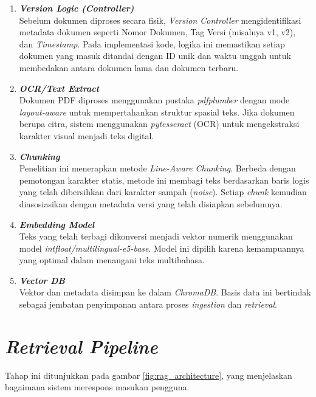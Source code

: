 \begin{enumerate}
    \item \textbf{\textit{Version Logic (Controller)}} \\
    Sebelum dokumen diproses secara fisik, \textit{Version Controller} mengidentifikasi metadata dokumen seperti Nomor Dokumen, Tag Versi (misalnya v1, v2), dan \textit{Timestamp}. Pada implementasi kode, logika ini memastikan setiap dokumen yang masuk ditandai dengan ID unik dan waktu unggah untuk membedakan antara dokumen lama dan dokumen terbaru.
    
    \item \textbf{\textit{OCR/Text Extract}} \\
    Dokumen PDF diproses menggunakan pustaka \textit{pdfplumber} dengan mode \textit{layout-aware} untuk mempertahankan struktur spasial teks. Jika dokumen berupa citra, sistem menggunakan \textit{pytesseract} (OCR) untuk mengekstraksi karakter visual menjadi teks digital.
    
    \item \textbf{\textit{Chunking}} \\
    Penelitian ini menerapkan metode \textit{Line-Aware Chunking}. Berbeda dengan pemotongan karakter statis, metode ini membagi teks berdasarkan baris logis yang telah dibersihkan dari karakter sampah (\textit{noise}). Setiap \textit{chunk} kemudian diasosiasikan dengan metadata versi yang telah disiapkan sebelumnya.
    
    \item \textbf{\textit{Embedding Model}} \\
    Teks yang telah terbagi dikonversi menjadi vektor numerik menggunakan model \textit{intfloat/multilingual-e5-base}. Model ini dipilih karena kemampuannya yang optimal dalam menangani teks multibahasa.
    
    \item \textbf{\textit{Vector DB}} \\
    Vektor dan metadata disimpan ke dalam \textit{ChromaDB}. Basis data ini bertindak sebagai jembatan penyimpanan antara proses \textit{ingestion} dan \textit{retrieval}.
\end{enumerate}

\newpage
\section{\textit{Retrieval Pipeline}}
Tahap ini ditunjukkan pada gambar \ref{fig:rag_architecture}, yang menjelaskan bagaimana sistem merespons masukan pengguna.

